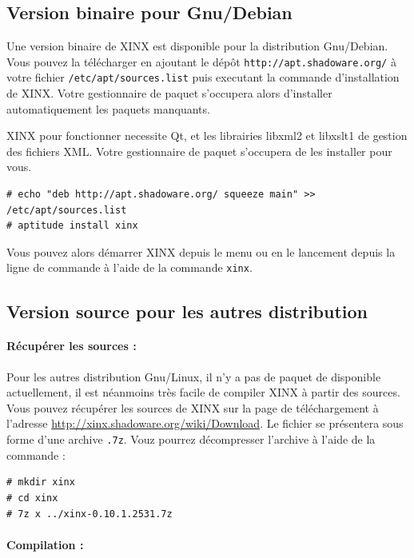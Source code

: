 \documentclass[a4paper,10pt,twoside]{book}
\begin{document}
\subsection{Version binaire pour Gnu/Debian}

Une version binaire de XINX est disponible pour la distribution Gnu/Debian. Vous pouvez la télécharger en ajoutant le dépôt \verb+http://apt.shadoware.org/+ à votre fichier \verb+/etc/apt/sources.list+ puis executant la commande d'installation de XINX. Votre gestionnaire de paquet s'occupera alors d'installer automatiquement les paquets manquants. 

XINX pour fonctionner necessite Qt, et les librairies libxml2 et libxslt1 de gestion des fichiers XML. Votre gestionnaire de paquet s'occupera de les installer pour vous.

\begin{verbatim}
# echo "deb http://apt.shadoware.org/ squeeze main" >> /etc/apt/sources.list
# aptitude install xinx
\end{verbatim}

Vous pouvez alors démarrer XINX depuis le menu ou en le lancement depuis la ligne de commande à l'aide de la commande \verb+xinx+. 

\subsection{Version source pour les autres distribution}

\paragraph{Récupérer les sources :}

Pour les autres distribution Gnu/Linux, il n'y a pas de paquet de disponible actuellement, il est néanmoins très facile de compiler XINX à partir des sources. Vous pouvez récupérer les sources de XINX sur la page de téléchargement à l'adresse \url{http://xinx.shadoware.org/wiki/Download}. Le fichier se présentera sous forme d'une archive \verb+.7z+. Vouz pourrez décompresser l'archive à l'aide de la commande :

\begin{verbatim}
# mkdir xinx
# cd xinx
# 7z x ../xinx-0.10.1.2531.7z
\end{verbatim}

\paragraph{Compilation :}
\end{document}
